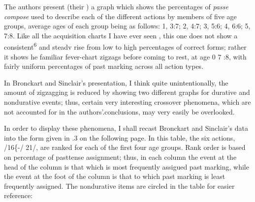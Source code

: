 
The authors present (their ) a graph which shows the percentages of \textit{passe} \textit{compose} used to describe each of the different actions by members of five age groups, average ages of each group being as follows: 1, 3:7; 2, 4:7; 3, 5:6; 4, 6:6; 5, 7:8. Like all the acquisition charts I have ever seen , this one does not show a consistent\textsuperscript{6} and steadv rise from low to high percentages of correct forms; rather it shows he familiar fever-chart zigzags before coming to rest, at age
0
7 :8, with fairly uniform percentages of past marking across all action types.


In Bronckart and Sinclair's presentation, I think quite unintentionally, the amount of zigzagging is reduced by showing two different graphs for durative and nondurative events; thus, certain very interesting crossover phenomena, which are not accounted for in the authors'.conclusions, may very easily be overlooked.

In order to display these phenomena, I shall recast Bronckart
and Sinclair's data into the form given in .3 on the following page. In this table, the six actions, /16\{-/ 21/, are ranked for each of the first four age groups. Rank order is based on percentage of past\-tense assignment; thus, in each column the event at the head of the column is that which is most frequently assigued past marking, while the event at the foot of the column is that to which past marking is least frequently assigned. The nondurative items are circled in the
table for easier reference:

